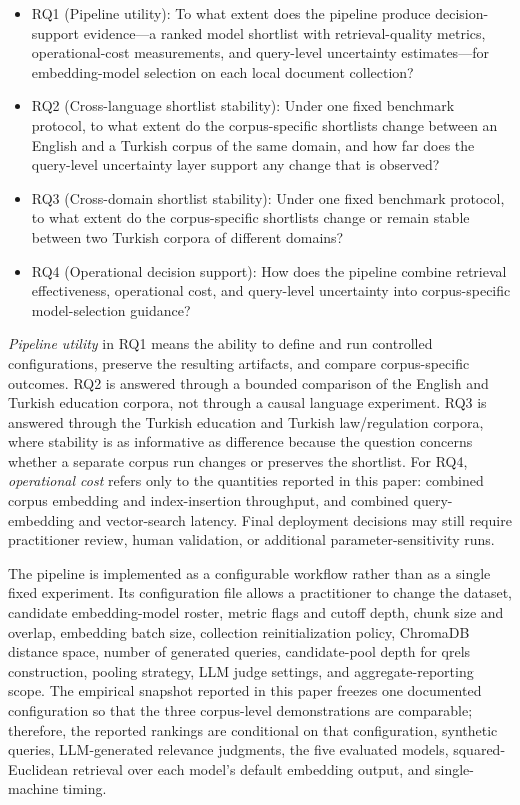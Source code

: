 \begin{itemize}
\tightlist
\item
  RQ1 (Pipeline utility): To what extent does the pipeline produce decision-support evidence---a ranked model shortlist with retrieval-quality metrics, operational-cost measurements, and query-level uncertainty estimates---for embedding-model selection on each local document collection?
\item
  RQ2 (Cross-language shortlist stability): Under one fixed benchmark protocol, to what extent do the corpus-specific shortlists change between an English and a Turkish corpus of the same domain, and how far does the query-level uncertainty layer support any change that is observed?
\item
  RQ3 (Cross-domain shortlist stability): Under one fixed benchmark protocol, to what extent do the corpus-specific shortlists change or remain stable between two Turkish corpora of different domains?
\item
  RQ4 (Operational decision support): How does the pipeline combine retrieval effectiveness, operational cost, and query-level uncertainty into corpus-specific model-selection guidance?
\end{itemize}

\emph{Pipeline utility} in RQ1 means the ability to define and run controlled configurations, preserve the resulting artifacts, and compare corpus-specific outcomes. RQ2 is answered through a bounded comparison of the English and Turkish education corpora, not through a causal language experiment. RQ3 is answered through the Turkish education and Turkish law/regulation corpora, where stability is as informative as difference because the question concerns whether a separate corpus run changes or preserves the shortlist. For RQ4, \emph{operational cost} refers only to the quantities reported in this paper: combined corpus embedding and index-insertion throughput, and combined query-embedding and vector-search latency. Final deployment decisions may still require practitioner review, human validation, or additional parameter-sensitivity runs.

The pipeline is implemented as a configurable workflow rather than as a single fixed experiment. Its configuration file allows a practitioner to change the dataset, candidate embedding-model roster, metric flags and cutoff depth, chunk size and overlap, embedding batch size, collection reinitialization policy, ChromaDB distance space, number of generated queries, candidate-pool depth for qrels construction, pooling strategy, LLM judge settings, and aggregate-reporting scope. The empirical snapshot reported in this paper freezes one documented configuration so that the three corpus-level demonstrations are comparable; therefore, the reported rankings are conditional on that configuration, synthetic queries, LLM-generated relevance judgments, the five evaluated models, squared-Euclidean retrieval over each model's default embedding output, and single-machine timing.

